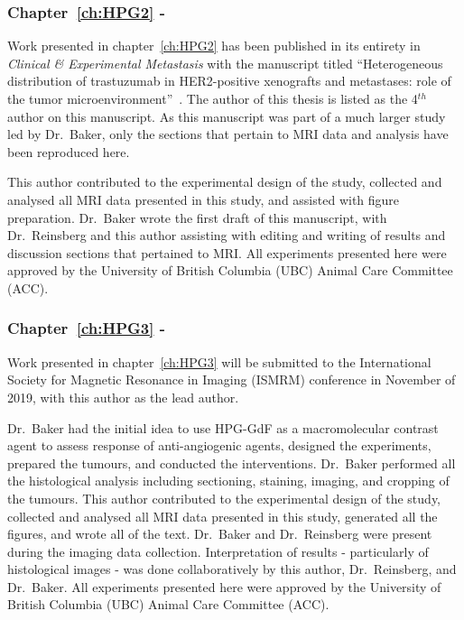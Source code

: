\subsubsection{Chapter~\ref{ch:HPG2} - }

Work presented in chapter~\ref{ch:HPG2} has been published in its entirety in \emph{Clinical \& Experimental Metastasis} with the manuscript titled ``Heterogeneous distribution of trastuzumab in HER2-positive xenografts and metastases: role of the tumor microenvironment''~\cite{Baker:2018ex}.
The author of this thesis is listed as the 4$^{th}$ author on this manuscript.
As this manuscript was part of a much larger study led by Dr.\ Baker, only the sections that pertain to MRI data and analysis have been reproduced here.

This author contributed to the experimental design of the study, collected and analysed all MRI data presented in this study, and assisted with figure preparation.
Dr.\ Baker wrote the first draft of this manuscript, with Dr.\ Reinsberg and this author assisting with editing and writing of results and discussion sections that pertained to MRI.
All experiments presented here were approved by the University of British Columbia (UBC) Animal Care Committee (ACC).

\subsubsection{Chapter~\ref{ch:HPG3} - }

Work presented in chapter~\ref{ch:HPG3} will be submitted to the International Society for Magnetic Resonance in Imaging (ISMRM) conference in November of 2019, with this author as the lead author.

Dr.\ Baker had the initial idea to use \acs{HPG-GdF} as a macromolecular contrast agent to assess response of anti-angiogenic agents, designed the experiments, prepared the tumours, and conducted the interventions.
Dr.\ Baker performed all the histological analysis including sectioning, staining, imaging, and cropping of the tumours.
This author contributed to the experimental design of the study, collected and analysed all MRI data presented in this study, generated all the figures, and wrote all of the text. 
Dr.\ Baker and Dr.\ Reinsberg were present during the imaging data collection.
Interpretation of results - particularly of histological images - was done collaboratively by this author, Dr.\ Reinsberg, and Dr.\ Baker.
All experiments presented here were approved by the University of British Columbia (UBC) Animal Care Committee (ACC).

